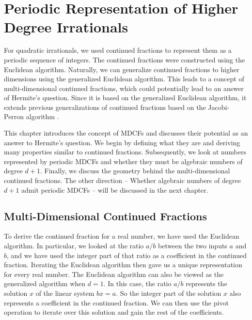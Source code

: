 \chapter{Periodic Representation of Higher Degree Irrationals}

For quadratic irrationals, we used continued fractions to represent them as a
periodic sequence of integers.
The continued fractions were constructed using the Euclidean algorithm.
Naturally, we can generalize continued fractions to higher dimensions using the
generalized Euclidean algorithm.
This leads to a concept of multi-dimensional continued fractions, which could
potentially lead to an answer of Hermite's question.
Since it is based on the generalized Euclidean algorithm,
it extends previous generalizations of continued fractions based on the
Jacobi-Perron algorithm \cite{Gupta00}.

This chapter introduces the concept of MDCFs and discusses their potential as
an answer to Hermite's question.
We begin by defining what they are and deriving many properties similar to
continued fractions.
Subsequently, we look at numbers represented by periodic MDCFs and whether they
must be algebraic numbers of degree $d+1$.
Finally, we discuss the geometry behind the multi-dimensional continued fractions.
The other direction -- Whether algebraic numbers of degree $d+1$ admit periodic
MDCFs -- will be discussed in the next chapter.

\section{Multi-Dimensional Continued Fractions}

To derive the continued fraction for a real number, we have used the Euclidean algorithm.
In particular, we looked at the ratio $a/b$ between the two inputs $a$ and $b$,
and we have used the integer part of that ratio as a coefficient in the
continued fraction.
Iterating the Euclidean algorithm then gave us a unique representation for
every real number.
The Euclidean algorithm can also be viewed as the generalized algorithm when $d = 1$.
In this case, the ratio $a/b$ represents the solution $x$ of the linear system $bx = a$.
So the integer part of the solution $x$ also represents a coefficient in the
continued fraction.
We can then use the pivot operation to iterate over this solution and gain the
rest of the coefficients.

